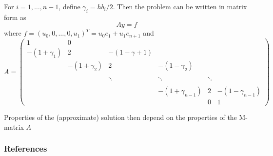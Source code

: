\documentclass[aspectratio=169]{beamer}
\begin{document}
\begin{frame} 
For $i=1,\ldots,n-1$, define $\gamma_i = {hb_i}/2$. 
Then the problem can be written in matrix form as
\begin{equation}
Ay=f
\end{equation}
where $f=(u_0,0,\ldots,0,u_1)^T=u_0e_1+u_1e_{n+1}$ and
{\footnotesize
\[
A=
\begin{pmatrix}
1 & 0 & \\
-(1+\gamma_1) & 2 & -(1-\gamma+1) & \\
& -(1+\gamma_2) & 2 & -(1-\gamma_2) & \\
& & & \\
& & \ddots & \ddots & \ddots \\
& & & \\
& & & -(1+\gamma_{n-1}) & 2 & -(1-\gamma_{n-1}) \\
& & & & 0 & 1
\end{pmatrix}
\]
}

Properties of the (approximate) solution then depend on the properties of the M-matrix $A$
\end{frame}






\begin{frame}[allowframebreaks]
\frametitle{References}


\end{frame}
\end{document}
